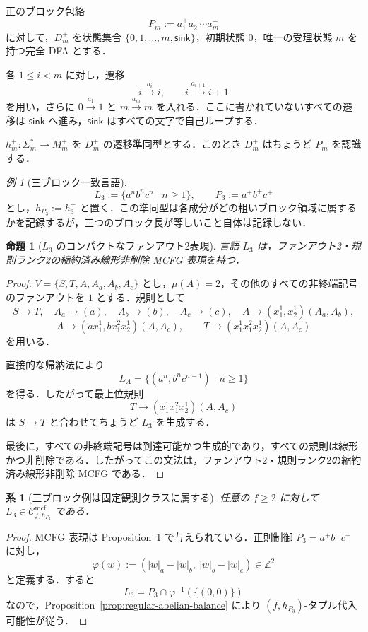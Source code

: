 \documentclass[11pt,a4paper]{ltjsarticle}
\numberwithin{equation}{section}
\theoremstyle{plain}
\newtheorem{proposition}[theorem]{命題}
\newtheorem{corollary}[theorem]{系}
\theoremstyle{definition}
\theoremstyle{remark}
\newtheorem{example}[theorem]{例}
\newcommand{\Cmcf}[2]{\mathcal{C}^{\mathrm{mcf}}_{#1,#2}}
\begin{document}
正のブロック包絡
\[
P_m:=a_1^+a_2^+\cdots a_m^+
\]
に対して，$D_m^+$ を状態集合
$\{0,1,\ldots,m,\mathsf{sink}\}$，初期状態 $0$，唯一の受理状態 $m$ を持つ完全 DFA とする．

各 $1\le i<m$ に対し，遷移
\[
  i\xrightarrow{a_i}i,
  \qquad
  i\xrightarrow{a_{i+1}}i+1
\]
を用い，さらに
$0\xrightarrow{a_1}1$ と $m\xrightarrow{a_m}m$ を入れる．ここに書かれていないすべての遷移は $\mathsf{sink}$ へ進み，$\mathsf{sink}$ はすべての文字で自己ループする．

$h_m^+:\Sigma_m^*\to M_m^+$ を $D_m^+$ の遷移準同型とする．このとき $D_m^+$ はちょうど $P_m$ を認識する．

\begin{example}[三ブロック一致言語]
\label{ex:l3-language}
\[
L_3:=\{a^n b^n c^n\mid n\ge1\},
\qquad
P_3:=a^+b^+c^+
\]
とし，$h_{P_3}:=h_3^+$ と置く．この準同型は各成分がどの粗いブロック領域に属するかを記録するが，三つのブロック長が等しいこと自体は記録しない．
\end{example}

\begin{proposition}[$L_3$ のコンパクトなファンアウト2表現]
\label{prop:l3-running-example}
言語 $L_3$ は，ファンアウト2・規則ランク2の縮約済み線形非削除 MCFG 表現を持つ．
\end{proposition}

\begin{proof}
$V=\{S,T,A,A_a,A_b,A_c\}$ とし，$\mu(A)=2$，その他のすべての非終端記号のファンアウトを $1$ とする．規則として
\[
  S\to T,\quad
  A_a\to(a),\quad
  A_b\to(b),\quad
  A_c\to(c),\quad
  A\to(x_1^1,x_2^1)(A_a,A_b),
\]
\[
  A\to(ax_1^1,bx_1^2x_2^1)(A,A_c),\qquad
  T\to(x_1^1x_1^2x_2^1)(A,A_c)
\]
を用いる．

直接的な帰納法により
\[
  L_A=\{(a^n,b^nc^{n-1})\mid n\ge1\}
\]
を得る．したがって最上位規則
\[
T\to(x_1^1x_1^2x_2^1)(A,A_c)
\]
は $S\to T$ と合わせてちょうど $L_3$ を生成する．

最後に，すべての非終端記号は到達可能かつ生成的であり，すべての規則は線形かつ非削除である．したがってこの文法は，ファンアウト2・規則ランク2の縮約済み線形非削除 MCFG である．
\end{proof}

\begin{corollary}[三ブロック例は固定観測クラスに属する]
\label{cor:l3-in-fixed-observation-class}
任意の $f\ge2$ に対して $L_3\in\Cmcf{f}{h_{P_3}}$ である．
\end{corollary}

\begin{proof}
MCFG 表現は Proposition~\ref{prop:l3-running-example} で与えられている．正則制御 $P_3=a^+b^+c^+$ に対し，
\[
\varphi(w):=(|w|_a-|w|_b,\ |w|_b-|w|_c)\in\mathbb Z^2
\]
と定義する．すると
\[
L_3=P_3\cap\varphi^{-1}(\{(0,0)\})
\]
なので，Proposition~\ref{prop:regular-abelian-balance} により
$(f,h_{P_3})$-タプル代入可能性が従う．
\end{proof}
\end{document}
